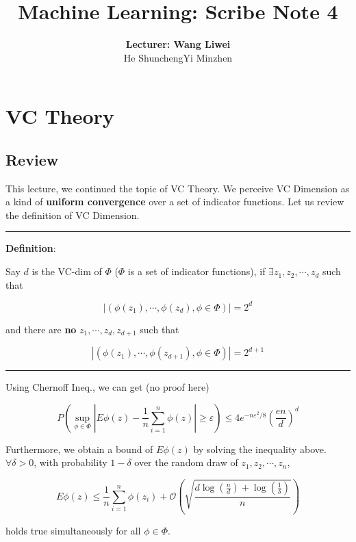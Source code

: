\documentclass[UTF8]{article}
\author{\textbf{Lecturer: Wang Liwei}\\He Shuncheng\hspace{18pt}Yi Minzhen}
\title{Machine Learning: Scribe Note 4}
\begin{document}
\maketitle
\section{VC Theory}
\subsection{Review}
This lecture, we continued the topic of VC Theory. We perceive VC Dimension as a kind of \textbf{uniform convergence} over a set of indicator functions. Let us review the definition of VC Dimension.\\
\rule{\textwidth}{0.5pt}\par
\textbf{Definition}:\par
\vspace{9pt}
Say $d$ is the VC-dim of $\Phi$ ($\Phi$ is a set of indicator functions), if $\exists z_{1}, z_{2},\cdots,z_{d}$ such that\par
\begin{equation*}
|{(\phi(z_{1}),\cdots,\phi(z_{d}), \phi\in\Phi)}|=2^{d}
\end{equation*}\par
and there are \textbf{no} $z_{1},\cdots, z_{d}, z_{d+1}$ such that\par
\begin{equation*}
|{(\phi(z_{1}),\cdots,\phi(z_{d+1}), \phi\in\Phi)}|=2^{d+1}
\end{equation*}
\rule{\textwidth}{0.5pt}\par
\vspace{9pt}
Using Chernoff Ineq., we can get (no proof here)\par
\begin{equation*}
P(\sup_{\phi\in\Phi}|E\phi(z)-\frac{1}{n}\sum_{i=1}^{n}\phi(z)|\geq\varepsilon)\leq 4e^{-n\varepsilon^{2}/8}(\frac{en}{d})^{d}
\end{equation*}\par
Furthermore, we obtain a bound of $E\phi(z)$ by solving the inequality above. $\forall\delta>0$, with probability $1-\delta$ over the random draw of $z_{1}, z_{2},\cdots, z_{n}$,\par
\begin{equation*}
E\phi(z)\leq\frac{1}{n}\sum_{i=1}^{n}\phi(z_{i})+\mathcal{O}\left(\sqrt{\frac{d\log(\frac{n}{d})+\log(\frac{1}{\delta})}{n}}\right)
\end{equation*}\par
holds true simultaneously for all $\phi\in\Phi$.\par
\end{document}
